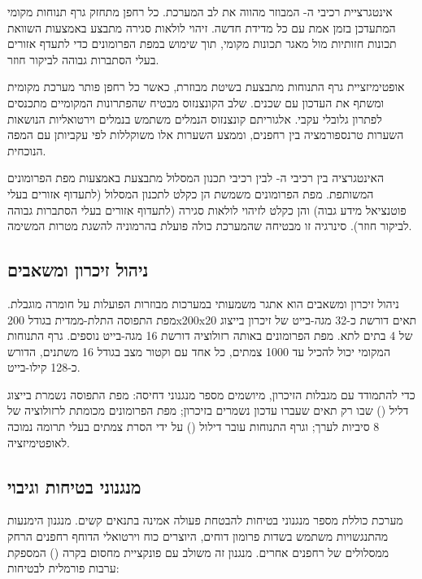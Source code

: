 אינטגרציית רכיבי ה- המבוזר מהווה את לב המערכת. כל רחפן מתחזק גרף תנוחות מקומי המתעדכן בזמן אמת עם כל מדידת  חדשה. זיהוי לולאות סגירה מתבצע באמצעות השוואת תכונות חזותיות מול מאגר תכונות מקומי, תוך שימוש במפת הפרומונים כדי לתעדף אזורים בעלי הסתברות גבוהה לביקור חוזר.

אופטימיזציית גרף התנוחות מתבצעת בשיטת  מבוזרת, כאשר כל רחפן פותר מערכת מקומית ומשתף את העדכון עם שכנים. שלב הקונצנזוס מבטיח שהפתרונות המקומיים מתכנסים לפתרון גלובלי עקבי. אלגוריתם קונצנזוס הנמלים משתמש בנמלים וירטואליות הנושאות השערות טרנספורמציה בין רחפנים, וממצע השערות אלו משוקללות לפי עקביותן עם המפה הנוכחית.

האינטגרציה בין רכיבי ה- לבין רכיבי תכנון המסלול מתבצעת באמצעות מפת הפרומונים המשותפת. מפת הפרומונים משמשת הן כקלט לתכנון המסלול (לתעדוף אזורים בעלי פוטנציאל מידע גבוה) והן כקלט לזיהוי לולאות סגירה (לתעדוף אזורים בעלי הסתברות גבוהה לביקור חוזר). סינרגיה זו מבטיחה שהמערכת כולה פועלת בהרמוניה להשגת מטרות המשימה.

\subsection{ניהול זיכרון ומשאבים}
\label{sec:ch07_memory_management}

ניהול זיכרון ומשאבים הוא אתגר משמעותי במערכות  מבוזרות הפועלות על חומרה מוגבלת. מפת התפוסה התלת-ממדית בגודל 200x200x20 תאים דורשת כ-32 מגה-בייט של זיכרון בייצוג  של 4 בתים לתא. מפת הפרומונים באותה רזולוציה דורשת 16 מגה-בייט נוספים. גרף התנוחות המקומי יכול להכיל עד 1000 צמתים, כל אחד עם וקטור מצב בגודל 16 משתנים, הדורש כ-128 קילו-בייט.

כדי להתמודד עם מגבלות הזיכרון, מיושמים מספר מנגנוני דחיסה: מפת התפוסה נשמרת בייצוג דליל () שבו רק תאים שעברו עדכון נשמרים בזיכרון; מפת הפרומונים מכומתת לרזולוציה של 8 סיביות לערך; וגרף התנוחות עובר דילול () על ידי הסרת צמתים בעלי תרומה נמוכה לאופטימיזציה.

\subsection{מנגנוני בטיחות וגיבוי}
\label{sec:ch07_safety}

מערכת  כוללת מספר מנגנוני בטיחות להבטחת פעולה אמינה בתנאים קשים. מנגנון הימנעות מהתנגשויות משתמש בשדות פרומון דוחים, היוצרים כוח וירטואלי הדוחף רחפנים הרחק ממסלולים של רחפנים אחרים. מנגנון זה משולב עם פונקציית מחסום בקרה () המספקת ערבות פורמלית לבטיחות:

